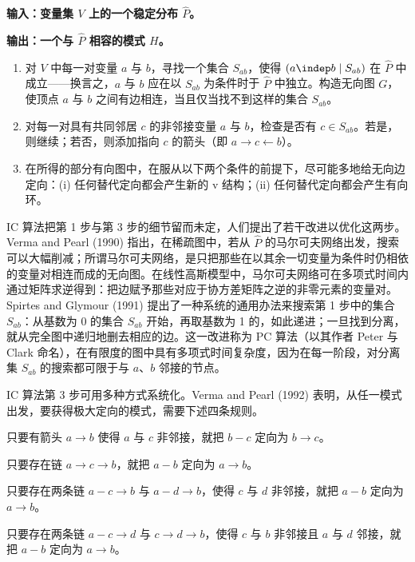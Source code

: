 \begin{techpoint}
\bfseries 输入：\normalfont 变量集 $V$ 上的一个稳定分布 $\hat{P}$。

\bfseries 输出：\normalfont 一个与 $\hat{P}$ 相容的模式 $H$。

\begin{enumerate}[label=\arabic*.,leftmargin=1.8em]
\item 对 $V$ 中每一对变量 $a$ 与 $b$，寻找一个集合 $S_{ab}$，使得 $(a\indep b\mid S_{ab})$ 在 $\hat{P}$ 中成立——换言之，$a$ 与 $b$ 应在以 $S_{ab}$ 为条件时于 $\hat{P}$ 中独立。构造无向图 $G$，使顶点 $a$ 与 $b$ 之间有边相连，当且仅当找不到这样的集合 $S_{ab}$。
\item 对每一对具有共同邻居 $c$ 的非邻接变量 $a$ 与 $b$，检查是否有 $c\in S_{ab}$。若是，则继续；若否，则添加指向 $c$ 的箭头（即 $a\to c\leftarrow b$）。
\item 在所得的部分有向图中，在服从以下两个条件的前提下，尽可能多地给无向边定向：(i) 任何替代定向都会产生新的 v 结构；(ii) 任何替代定向都会产生有向环。
\end{enumerate}
\end{techpoint}

IC 算法把第 1 步与第 3 步的细节留而未定，人们提出了若干改进以优化这两步。Verma and Pearl (1990) 指出，在稀疏图中，若从 $\hat{P}$ 的马尔可夫网络出发，搜索可以大幅削减；所谓马尔可夫网络，是只把那些在以其余一切变量为条件时仍相依的变量对相连而成的无向图。在线性高斯模型中，马尔可夫网络可在多项式时间内通过矩阵求逆得到：把边赋予那些对应于协方差矩阵之逆的非零元素的变量对。Spirtes and Glymour (1991) 提出了一种系统的通用办法来搜索第 1 步中的集合 $S_{ab}$：从基数为 0 的集合 $S_{ab}$ 开始，再取基数为 1 的，如此递进；一旦找到分离，就从完全图中递归地删去相应的边。这一改进称为 PC 算法（以其作者 Peter 与 Clark 命名），在有限度的图中具有多项式时间复杂度，因为在每一阶段，对分离集 $S_{ab}$ 的搜索都可限于与 $a$、$b$ 邻接的节点。

IC 算法第 3 步可用多种方式系统化。Verma and Pearl (1992) 表明，从任一模式出发，要获得极大定向的模式，需要下述四条规则。

\begin{description}[leftmargin=2.2em,style=nextline,itemsep=0.2em]
\item[\textbf{R1：}] 只要有箭头 $a\to b$ 使得 $a$ 与 $c$ 非邻接，就把 $b-c$ 定向为 $b\to c$。
\item[\textbf{R2：}] 只要存在链 $a\to c\to b$，就把 $a-b$ 定向为 $a\to b$。
\item[\textbf{R3：}] 只要存在两条链 $a-c\to b$ 与 $a-d\to b$，使得 $c$ 与 $d$ 非邻接，就把 $a-b$ 定向为 $a\to b$。
\item[\textbf{R4：}] 只要存在两条链 $a-c\to d$ 与 $c\to d\to b$，使得 $c$ 与 $b$ 非邻接且 $a$ 与 $d$ 邻接，就把 $a-b$ 定向为 $a\to b$。
\end{description}

